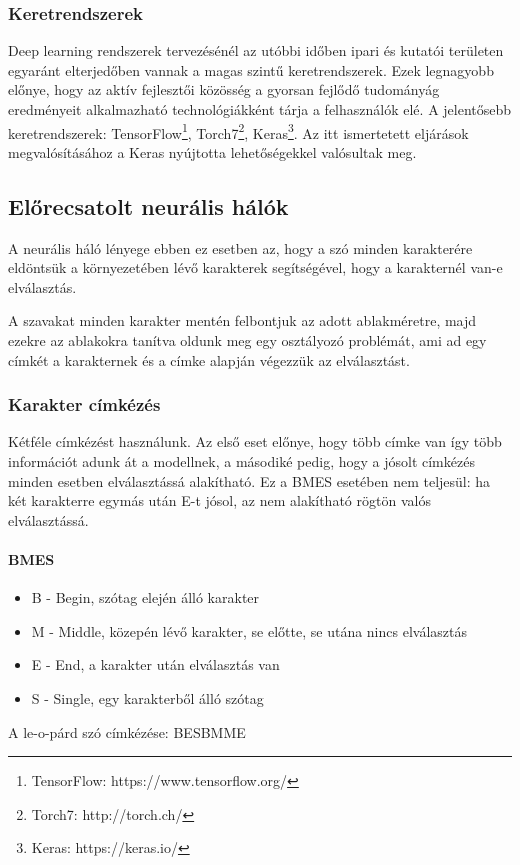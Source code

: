 \documentclass[a4paper, magyar]{article}
\begin{document}
\subsubsection{Keretrendszerek}
Deep learning rendszerek tervezésénél az utóbbi időben ipari és kutatói területen egyaránt elterjedőben vannak a magas szintű keretrendszerek. Ezek legnagyobb előnye, hogy az aktív fejlesztői közösség a gyorsan fejlődő tudományág eredményeit alkalmazható technológiákként tárja a felhasználók elé. A jelentősebb keretrendszerek: TensorFlow\footnote{TensorFlow: https://www.tensorflow.org/}, Torch7\footnote{Torch7: http://torch.ch/}, Keras\footnote{Keras: https://keras.io/}. Az itt ismertetett eljárások megvalósításához a Keras nyújtotta lehetőségekkel valósultak meg\cite{chollet2015keras}. 
\subsection{Előrecsatolt neurális hálók}
A neurális háló lényege ebben ez esetben az, hogy a szó minden karakterére eldöntsük a környezetében lévő karakterek segítségével, hogy a karakternél van-e elválasztás.

A szavakat minden karakter mentén felbontjuk az adott ablakméretre, majd ezekre az ablakokra tanítva oldunk meg egy osztályozó problémát, ami ad egy címkét a karakternek és a címke alapján végezzük az elválasztást.
\subsubsection{Karakter címkézés}
Kétféle címkézést használunk. Az első eset előnye, hogy több címke van így több információt adunk át a modellnek, a másodiké pedig, hogy a jósolt címkézés minden esetben elválasztássá alakítható. Ez a BMES esetében nem teljesül: ha két karakterre egymás után E-t jósol, az nem alakítható rögtön valós elválasztássá. 
\paragraph{BMES}
\begin{itemize}
	\item B - Begin, szótag elején álló karakter
	\item M - Middle, közepén lévő karakter, se előtte, se utána nincs elválasztás
	\item E - End, a karakter után elválasztás van
	\item S - Single, egy karakterből álló szótag
\end{itemize}
A
{\selectfont
	le-o-párd%
}
szó címkézése:
{\selectfont
	BESBMME%
}
\end{document}
